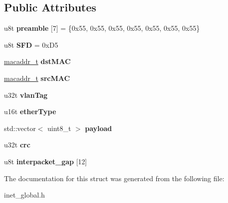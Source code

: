 \subsection*{Public Attributes}
\begin{DoxyCompactItemize}
\item 
\mbox{\label{structeth__vlan__frame__t_a78999322e3f11cb4c7e64f63671c9200}} 
u8t {\bfseries preamble} \mbox{[}7\mbox{]} = \{0x55, 0x55, 0x55, 0x55, 0x55, 0x55, 0x55\}
\item 
\mbox{\label{structeth__vlan__frame__t_a69b29b6322d0d6d73939bff432538d06}} 
u8t {\bfseries S\+FD} = 0x\+D5
\item 
\mbox{\label{structeth__vlan__frame__t_af65384a13f1fbccc547ffcd5bd1914c1}} 
\hyperlink{structmacaddr__t}{macaddr\+\_\+t} {\bfseries dst\+M\+AC}
\item 
\mbox{\label{structeth__vlan__frame__t_ae08beab62fa2486d9e06746fc62d5ae0}} 
\hyperlink{structmacaddr__t}{macaddr\+\_\+t} {\bfseries src\+M\+AC}
\item 
\mbox{\label{structeth__vlan__frame__t_a2170006324fff8cb5f96172a340ef852}} 
u32t {\bfseries vlan\+Tag}
\item 
\mbox{\label{structeth__vlan__frame__t_ab1a9bcb061996b0a8a384c89ae7477dc}} 
u16t {\bfseries ether\+Type}
\item 
\mbox{\label{structeth__vlan__frame__t_a3724d5d625e71ba2008fa1d058b1be76}} 
std\+::vector$<$ uint8\+\_\+t $>$ {\bfseries payload}
\item 
\mbox{\label{structeth__vlan__frame__t_a99ce30cc2b1b0c61306f056e71aa497d}} 
u32t {\bfseries crc}
\item 
\mbox{\label{structeth__vlan__frame__t_aa68bb1e435d49b46770315990b3e2021}} 
u8t {\bfseries interpacket\+\_\+gap} \mbox{[}12\mbox{]}
\end{DoxyCompactItemize}


The documentation for this struct was generated from the following file\+:\begin{DoxyCompactItemize}
\item 
inet\+\_\+global.\+h\end{DoxyCompactItemize}
